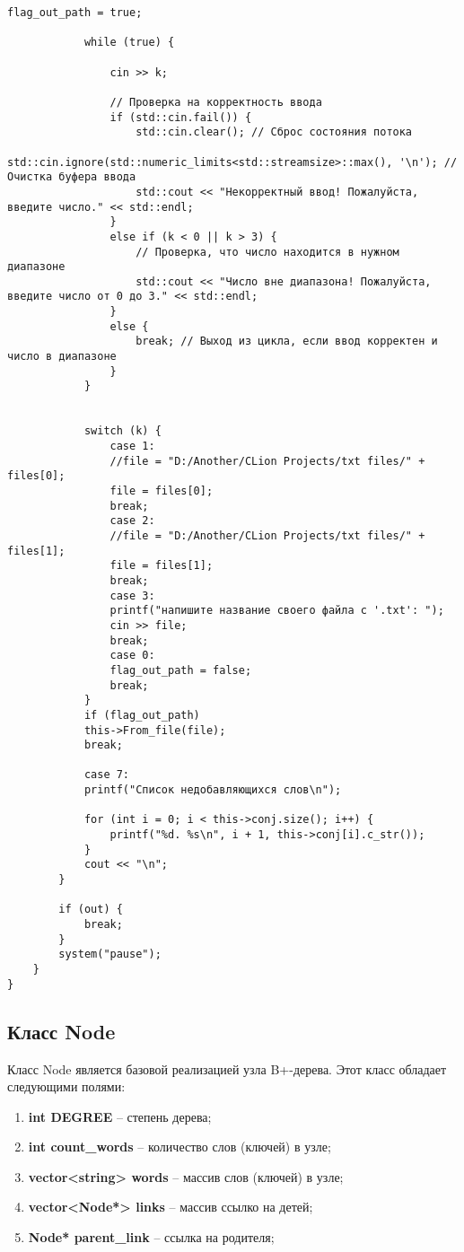 \documentclass[10pt,a4paper,final]{article} %
\begin{document}
\begin{lstlisting}[label=menuMethod, caption = Метод menu]
			flag_out_path = true;
			
			while (true) {
				
				cin >> k;
				
				// Проверка на корректность ввода
				if (std::cin.fail()) {
					std::cin.clear(); // Сброс состояния потока
					std::cin.ignore(std::numeric_limits<std::streamsize>::max(), '\n'); // Очистка буфера ввода
					std::cout << "Некорректный ввод! Пожалуйста, введите число." << std::endl;
				}
				else if (k < 0 || k > 3) {
					// Проверка, что число находится в нужном диапазоне
					std::cout << "Число вне диапазона! Пожалуйста, введите число от 0 до 3." << std::endl;
				}
				else {
					break; // Выход из цикла, если ввод корректен и число в диапазоне
				}
			}
			
			
			switch (k) {
				case 1:
				//file = "D:/Another/CLion Projects/txt files/" + files[0];
				file = files[0];
				break;
				case 2:
				//file = "D:/Another/CLion Projects/txt files/" + files[1];
				file = files[1];
				break;
				case 3:
				printf("напишите название своего файла с '.txt': ");
				cin >> file;
				break;
				case 0:
				flag_out_path = false;
				break;
			}
			if (flag_out_path)
			this->From_file(file);
			break;
			
			case 7:
			printf("Cписок недобавляющихся слов\n");
			
			for (int i = 0; i < this->conj.size(); i++) {
				printf("%d. %s\n", i + 1, this->conj[i].c_str());
			}
			cout << "\n";
		}
		
		if (out) {
			break;
		}
		system("pause");
	}
}
\end{lstlisting}


\subsection{Класс Node}
Класс Node является базовой реализацией узла B+-дерева. Этот класс обладает следующими полями:
\begin{enumerate}
	\item \textbf{int DEGREE} -- степень дерева; 
	\item \textbf{int count\_words} -- количество слов (ключей) в узле;
	\item \textbf{vector<string> words} -- массив  слов (ключей) в узле; 
	\item \textbf{vector<Node*> links} -- массив ссылко на детей;
	\item \textbf{Node* parent\_link} -- ссылка на родителя;
	
\end{enumerate}
\end{document}
